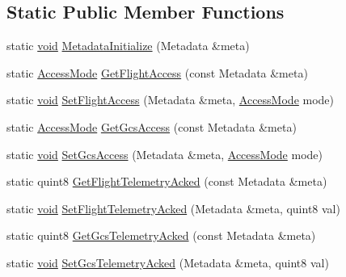 \subsection*{\-Static \-Public \-Member \-Functions}
\begin{DoxyCompactItemize}
\item 
static \hyperlink{group___u_a_v_objects_plugin_ga444cf2ff3f0ecbe028adce838d373f5c}{void} \hyperlink{group___u_a_v_objects_plugin_ga0e0e6753710634f75bf5f27e0c3e073a}{\-Metadata\-Initialize} (\-Metadata \&meta)
\item 
static \hyperlink{group___u_a_v_objects_plugin_ga80357a2f38fa4be23200de86614c3d77}{\-Access\-Mode} \hyperlink{group___u_a_v_objects_plugin_ga98889e5102c4c2d2c9f1a47c03633218}{\-Get\-Flight\-Access} (const \-Metadata \&meta)
\item 
static \hyperlink{group___u_a_v_objects_plugin_ga444cf2ff3f0ecbe028adce838d373f5c}{void} \hyperlink{group___u_a_v_objects_plugin_gaa660f23e03de07c425e5162e2dc42c4f}{\-Set\-Flight\-Access} (\-Metadata \&meta, \hyperlink{group___u_a_v_objects_plugin_ga80357a2f38fa4be23200de86614c3d77}{\-Access\-Mode} mode)
\item 
static \hyperlink{group___u_a_v_objects_plugin_ga80357a2f38fa4be23200de86614c3d77}{\-Access\-Mode} \hyperlink{group___u_a_v_objects_plugin_ga7efd83f9d2ce75464022ed2e05c33920}{\-Get\-Gcs\-Access} (const \-Metadata \&meta)
\item 
static \hyperlink{group___u_a_v_objects_plugin_ga444cf2ff3f0ecbe028adce838d373f5c}{void} \hyperlink{group___u_a_v_objects_plugin_ga55ae4b0f44dc39c52da3d4173345c19b}{\-Set\-Gcs\-Access} (\-Metadata \&meta, \hyperlink{group___u_a_v_objects_plugin_ga80357a2f38fa4be23200de86614c3d77}{\-Access\-Mode} mode)
\item 
static quint8 \hyperlink{group___u_a_v_objects_plugin_ga98522650b206f948c9141115c15d1d13}{\-Get\-Flight\-Telemetry\-Acked} (const \-Metadata \&meta)
\item 
static \hyperlink{group___u_a_v_objects_plugin_ga444cf2ff3f0ecbe028adce838d373f5c}{void} \hyperlink{group___u_a_v_objects_plugin_ga92f2e8fef7adb87575582d52a4d90519}{\-Set\-Flight\-Telemetry\-Acked} (\-Metadata \&meta, quint8 val)
\item 
static quint8 \hyperlink{group___u_a_v_objects_plugin_ga3bfcc38f5830eeea1369a6e7c3aa3214}{\-Get\-Gcs\-Telemetry\-Acked} (const \-Metadata \&meta)
\item 
static \hyperlink{group___u_a_v_objects_plugin_ga444cf2ff3f0ecbe028adce838d373f5c}{void} \hyperlink{group___u_a_v_objects_plugin_ga190e264f603dd8ade6b6f9e84debfb4c}{\-Set\-Gcs\-Telemetry\-Acked} (\-Metadata \&meta, quint8 val)

\end{DoxyCompactItemize}
